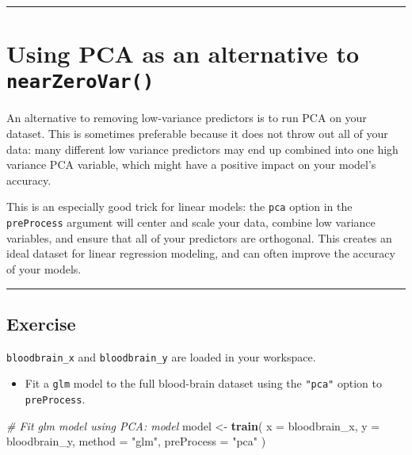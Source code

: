 \documentclass[]{book}
\newenvironment{Shaded}{\begin{snugshade}}{\end{snugshade}}
\newcommand{\KeywordTok}[1]{\textcolor[rgb]{0.13,0.29,0.53}{\textbf{#1}}}
\newcommand{\DataTypeTok}[1]{\textcolor[rgb]{0.13,0.29,0.53}{#1}}
\newcommand{\StringTok}[1]{\textcolor[rgb]{0.31,0.60,0.02}{#1}}
\newcommand{\CommentTok}[1]{\textcolor[rgb]{0.56,0.35,0.01}{\textit{#1}}}
\newcommand{\NormalTok}[1]{#1}
\providecommand{\tightlist}{%
  \setlength{\itemsep}{0pt}\setlength{\parskip}{0pt}}
\begin{document}
\begin{center}\rule{0.5\linewidth}{\linethickness}\end{center}

\section{\texorpdfstring{Using PCA as an alternative to
\texttt{nearZeroVar()}}{Using PCA as an alternative to nearZeroVar()}}\label{using-pca-as-an-alternative-to-nearzerovar}

An alternative to removing low-variance predictors is to run PCA on your
dataset. This is sometimes preferable because it does not throw out all
of your data: many different low variance predictors may end up combined
into one high variance PCA variable, which might have a positive impact
on your model's accuracy.

This is an especially good trick for linear models: the \texttt{pca}
option in the \texttt{preProcess} argument will center and scale your
data, combine low variance variables, and ensure that all of your
predictors are orthogonal. This creates an ideal dataset for linear
regression modeling, and can often improve the accuracy of your models.

\begin{center}\rule{0.5\linewidth}{\linethickness}\end{center}

\subsection*{Exercise}\label{exercise-28}

\texttt{bloodbrain\_x} and \texttt{bloodbrain\_y} are loaded in your
workspace.

\begin{itemize}
\tightlist
\item
  Fit a \texttt{glm} model to the full blood-brain dataset using the
  \texttt{"pca"} option to \texttt{preProcess}.
\end{itemize}

\begin{Shaded}
\begin{Highlighting}[]
\CommentTok{# Fit glm model using PCA: model}
\NormalTok{model <-}\StringTok{ }\KeywordTok{train}\NormalTok{(}
  \DataTypeTok{x =}\NormalTok{ bloodbrain_x, }\DataTypeTok{y =}\NormalTok{ bloodbrain_y,}
  \DataTypeTok{method =} \StringTok{"glm"}\NormalTok{, }\DataTypeTok{preProcess =} \StringTok{"pca"}
\NormalTok{)}
\end{Highlighting}
\end{Shaded}
\end{document}
